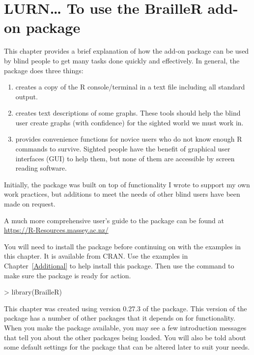
\chapter{LURN\ldots{} To use the BrailleR add-on package} 
\label{BrailleR}  



 
This chapter provides a brief explanation of  how the  add-on package can be used by blind people to get many tasks done quickly and effectively. In general, the package does three things:\begin{enumerate} 
\item creates a copy of the R console/terminal in a text file including all standard output. 
\item creates text descriptions of some graphs. These tools should help the blind user create graphs (with confidence) for the sighted world we must work in. 
\item provides convenience functions for novice users who do not know enough R commands to survive. Sighted people have the benefit of graphical user interfaces (GUI) to help them, but none of them are accessible by screen reading software. 
\end{enumerate} 
Initially, the package was built on top of functionality I wrote to support my own work practices, but additions to meet the needs of other blind \R{} users have been made on request.  
 
 A much more comprehensive user's guide to the   package can be found at \url{https://R-Resources.massey.ac.nz/}

You will need to install the  package before continuing on with the examples in this chapter. It is available from CRAN. Use the examples in Chapter~\ref{Additional} to help install this package. Then use the  command to make sure the package is ready for action. 

\begin{Schunk}
\begin{Sinput}
> library(BrailleR) 
\end{Sinput}
\end{Schunk}

This chapter was created using version 0.27.3 of the  package. This version of the package has a number of other packages that it depends on for functionality. When you make the  package available, you may see a few introduction messages that tell you about the other packages being loaded. You will also be told about some default settings for the package that can be altered later to suit your needs. 

